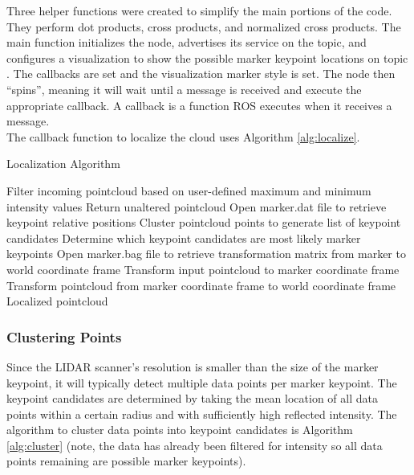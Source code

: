 Three helper functions were created to simplify the main portions of the code. They perform dot products, cross products, and normalized cross products. The main function initializes the node, advertises its service on the  topic, and configures a visualization to show the possible marker keypoint locations on topic . The  callbacks are set and the visualization marker style is set. The node then ``spins'', meaning it will wait until a message is received and execute the appropriate callback. A callback is a function ROS executes when it receives a message.\\

The callback function to localize the cloud uses Algorithm \ref{alg:localize}.
\begin{algorithm}[H]
\caption{Localization Algorithm}
\label{alg:localize}
\begin{algorithmic}[1]
\begin{raggedright}
\State Filter incoming pointcloud based on user-defined maximum and minimum intensity values
\State Return unaltered pointcloud
\Else
\State Open marker.dat file to retrieve keypoint relative positions
\State Cluster pointcloud points to generate list of keypoint candidates
\State Determine which keypoint candidates are most likely marker keypoints
\State Open marker.bag file to retrieve transformation matrix from marker to world coordinate frame
\State Transform input pointcloud to marker coordinate frame
\State Transform pointcloud from marker coordinate frame to world coordinate frame \EndIf
\EndFunction\\
\Return Localized pointcloud
\end{raggedright}
\end{algorithmic}
\end{algorithm}

\subsubsection{Clustering Points}
Since the LIDAR scanner's resolution is smaller than the size of the marker keypoint, it will typically detect multiple data points per marker keypoint. The keypoint candidates are determined by taking the mean location of all data points within a certain radius and with sufficiently high reflected intensity. The algorithm to cluster data points into keypoint candidates is Algorithm \ref{alg:cluster} (note, the data has already been filtered for intensity so all data points remaining are possible marker keypoints).

